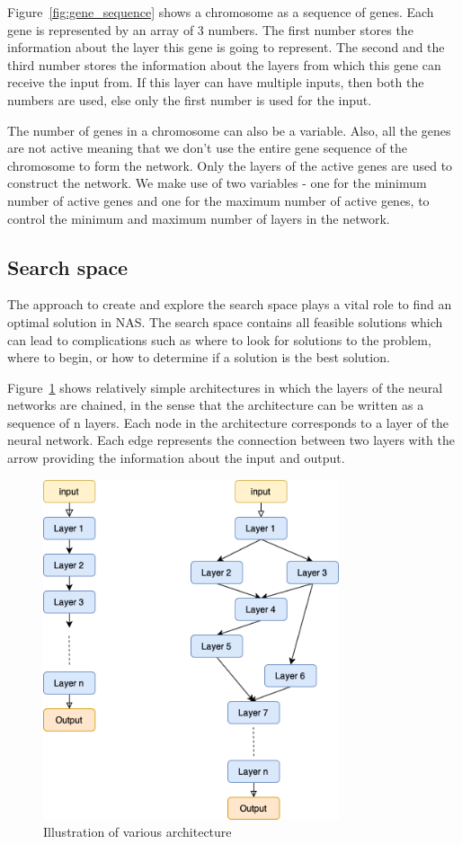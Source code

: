 Figure~\ref{fig:gene_sequence} shows a chromosome as a sequence of genes. Each gene is represented by an array of 3 numbers. The first number stores the information about the layer this gene is going to represent. The second and the third number stores the information about the layers from which this gene can receive the input from. If this layer can have multiple inputs, then both the numbers are used, else only the first number is used for the input. 

The number of genes in a chromosome can also be a variable. Also, all the genes are not active meaning that we don't use the entire gene sequence of the chromosome to form the network. Only the layers of the active genes are used to construct the network. We make use of two variables - one for the minimum number of active genes and one for the maximum number of active genes, to control the minimum and maximum number of layers in the network.

\subsection{Search space}
\label{sec:search_space}

The approach to create and explore the search space plays a vital role to find an optimal solution in NAS. The search space contains all feasible solutions which can lead to complications such as where to look for solutions to the problem, where to begin, or how to determine if a solution is the best solution.

Figure~\ref{fig:various_architecture} shows relatively simple architectures in which the layers of the neural networks are chained, in the sense that the architecture can be written as a sequence of n layers. Each node in the architecture corresponds to a layer of the neural network. Each edge represents the connection between two layers with the arrow providing the information about the input and output. 

\begin{figure}[t]
    \centering
    \includegraphics[width=0.7\linewidth, height=10cm]{BachelorMasterThesis/ApproachAndImplementation/Figures/VariousArchitecture.png}
    \caption{Illustration of various architecture}
    \label{fig:various_architecture}
\end{figure}

